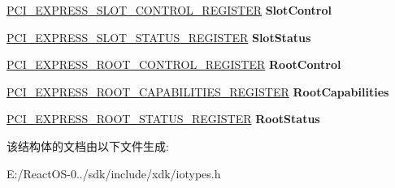 \begin{DoxyCompactItemize}
\hyperlink{union___p_c_i___e_x_p_r_e_s_s___s_l_o_t___c_o_n_t_r_o_l___r_e_g_i_s_t_e_r}{P\+C\+I\+\_\+\+E\+X\+P\+R\+E\+S\+S\+\_\+\+S\+L\+O\+T\+\_\+\+C\+O\+N\+T\+R\+O\+L\+\_\+\+R\+E\+G\+I\+S\+T\+ER} {\bfseries Slot\+Control}
\item 
\mbox{\label{struct___p_c_i___e_x_p_r_e_s_s___c_a_p_a_b_i_l_i_t_y_a1818c9a8a6469e88d8a6445731d2854a}} 
\hyperlink{union___p_c_i___e_x_p_r_e_s_s___s_l_o_t___s_t_a_t_u_s___r_e_g_i_s_t_e_r}{P\+C\+I\+\_\+\+E\+X\+P\+R\+E\+S\+S\+\_\+\+S\+L\+O\+T\+\_\+\+S\+T\+A\+T\+U\+S\+\_\+\+R\+E\+G\+I\+S\+T\+ER} {\bfseries Slot\+Status}
\item 
\mbox{\label{struct___p_c_i___e_x_p_r_e_s_s___c_a_p_a_b_i_l_i_t_y_a6e8dadb2544536aa153ff8de8f83c25a}} 
\hyperlink{union___p_c_i___e_x_p_r_e_s_s___r_o_o_t___c_o_n_t_r_o_l___r_e_g_i_s_t_e_r}{P\+C\+I\+\_\+\+E\+X\+P\+R\+E\+S\+S\+\_\+\+R\+O\+O\+T\+\_\+\+C\+O\+N\+T\+R\+O\+L\+\_\+\+R\+E\+G\+I\+S\+T\+ER} {\bfseries Root\+Control}
\item 
\mbox{\label{struct___p_c_i___e_x_p_r_e_s_s___c_a_p_a_b_i_l_i_t_y_a573ce1a0b1c90387159f9344ef7731e7}} 
\hyperlink{union___p_c_i___e_x_p_r_e_s_s___r_o_o_t___c_a_p_a_b_i_l_i_t_i_e_s___r_e_g_i_s_t_e_r}{P\+C\+I\+\_\+\+E\+X\+P\+R\+E\+S\+S\+\_\+\+R\+O\+O\+T\+\_\+\+C\+A\+P\+A\+B\+I\+L\+I\+T\+I\+E\+S\+\_\+\+R\+E\+G\+I\+S\+T\+ER} {\bfseries Root\+Capabilities}
\item 
\mbox{\label{struct___p_c_i___e_x_p_r_e_s_s___c_a_p_a_b_i_l_i_t_y_ab467dc246493d3cb23ff6d7e17cae07f}} 
\hyperlink{union___p_c_i___e_x_p_r_e_s_s___r_o_o_t___s_t_a_t_u_s___r_e_g_i_s_t_e_r}{P\+C\+I\+\_\+\+E\+X\+P\+R\+E\+S\+S\+\_\+\+R\+O\+O\+T\+\_\+\+S\+T\+A\+T\+U\+S\+\_\+\+R\+E\+G\+I\+S\+T\+ER} {\bfseries Root\+Status}
\end{DoxyCompactItemize}


该结构体的文档由以下文件生成\+:\begin{DoxyCompactItemize}
\item 
E\+:/\+React\+O\+S-\/0../sdk/include/xdk/iotypes.\+h\end{DoxyCompactItemize}
